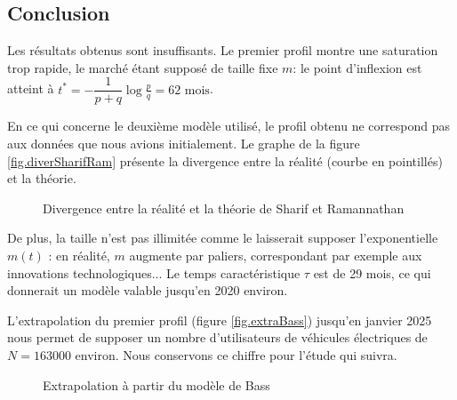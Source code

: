 	\subsection{Conclusion}
		
		Les résultats obtenus sont insuffisants. Le premier profil montre une saturation trop rapide, le marché étant supposé de taille fixe $m$: le point d'inflexion est atteint à $t^* = -\dfrac{1}{p+q} \log{\frac{p}{q}} = 62 \text{ mois}$.

		En ce qui concerne le deuxième modèle utilisé, le profil obtenu ne correspond pas aux données que nous avions initialement. Le graphe de la figure \vref{fig.diverSharifRam} présente la divergence entre la réalité (courbe en pointillés) et la théorie.
		
		\begin{figure}[!h]
			\centering
			\caption{Divergence entre la réalité et la théorie de Sharif et Ramannathan \label{fig.diverSharifRam}}
		\end{figure}
		
		De plus, la taille n'est pas illimitée comme le laisserait supposer l'exponentielle $m(t)$ : en réalité, $m$ augmente par paliers, correspondant par exemple aux innovations technologiques... Le temps caractéristique $\tau$ est de 29 mois, ce qui donnerait un modèle valable jusqu'en 2020 environ.
		
		L'extrapolation du premier profil (figure \vref{fig.extraBass}) jusqu'en janvier 2025 nous permet de supposer un nombre d'utilisateurs de véhicules électriques de $N = \num{163000}$ environ. Nous conservons ce chiffre pour l'étude qui suivra.
		
		\begin{figure}[!h]
			\centering
			\caption{Extrapolation à partir du modèle de Bass \label{fig.extraBass}}
		\end{figure}